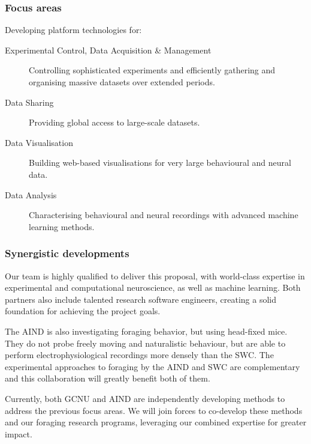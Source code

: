 
\subsubsection{Focus areas}

Developing platform technologies for:

\begin{description}

    \item[Experimental Control, Data Acquisition \& Management] Controlling
        sophisticated experiments and efficiently gathering and organising
        massive datasets over extended periods.

    \item[Data Sharing] Providing global access to large-scale datasets.

    \item[Data Visualisation] Building web-based visualisations for very large
        behavioural and neural data.

    \item[Data Analysis] Characterising behavioural and neural recordings with
        advanced machine learning methods.

\end{description}

\subsubsection{Synergistic developments}

Our team is highly qualified to deliver this proposal, with world-class
expertise in experimental and computational neuroscience, as well as machine
learning.
%
Both partners also include talented research software engineers, creating a
solid foundation for achieving the project goals.

%

The AIND is also investigating foraging behavior, but using head-fixed mice.
They do not probe freely moving and naturalistic behaviour, but are able to
perform electrophysiological recordings more densely than the SWC.
%
The experimental approaches to foraging by the AIND and SWC are complementary
and this collaboration will greatly benefit both of them.

Currently, both GCNU and AIND are independently developing methods to address
the previous focus areas. We will join forces to co-develop these methods and
our foraging research programs, leveraging our combined expertise for greater
impact.
